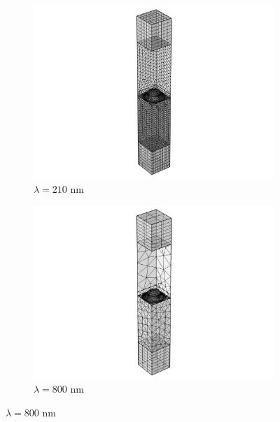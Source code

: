 \begin{figure}[htb]
    \centering
    \begin{subfigure}{.2\textwidth}
        \centering
        \includegraphics[scale=0.4, trim=12cm 0cm 12cm 0cm, clip]{figures/ch4/Mesh_210nm_hair=hsub=500_PMLheight=250_current.png}
        \caption{$\lambda=210$ nm}
        \label{fig:meshDomainHeight_a}
    \end{subfigure}%
    \begin{subfigure}{.2\textwidth}
        \centering %
        \includegraphics[scale=0.4, trim=12cm 0cm 12cm 0cm, clip]{figures/ch4/Mesh_800nm_hair=hsub=500_PMLheight=250_current.png}
        \caption{$\lambda=800$ nm}
        \label{fig:meshDomainHeight_b}
    \end{subfigure}

\end{figure}
